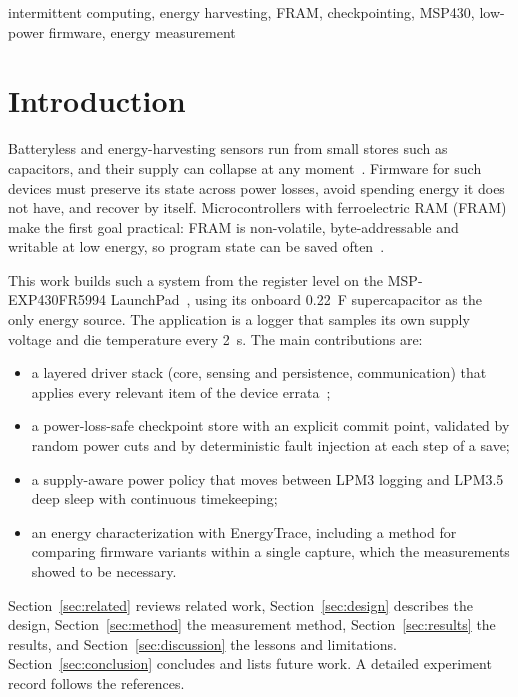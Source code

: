 \documentclass[conference]{IEEEtran}
\begin{document}
\begin{IEEEkeywords}
intermittent computing, energy harvesting, FRAM, checkpointing, MSP430, low-power firmware, energy measurement
\end{IEEEkeywords}

\section{Introduction}

Batteryless and energy-harvesting sensors run from small stores such as capacitors, and their supply can collapse at any moment~\cite{hester2017future,lucia2017snapl}. Firmware for such devices must preserve its state across power losses, avoid spending energy it does not have, and recover by itself. Microcontrollers with ferroelectric RAM (FRAM) make the first goal practical: FRAM is non-volatile, byte-addressable and writable at low energy, so program state can be saved often~\cite{jayakumar2014quickrecall}.

This work builds such a system from the register level on the MSP-EXP430FR5994 LaunchPad~\cite{ti_slau678}, using its onboard \SI{0.22}{\farad} supercapacitor as the only energy source. The application is a logger that samples its own supply voltage and die temperature every \SI{2}{\second}. The main contributions are:
\begin{itemize}
  \item a layered driver stack (core, sensing and persistence, communication) that applies every relevant item of the device errata~\cite{ti_slaz681};
  \item a power-loss-safe checkpoint store with an explicit commit point, validated by random power cuts and by deterministic fault injection at each step of a save;
  \item a supply-aware power policy that moves between LPM3 logging and LPM3.5 deep sleep with continuous timekeeping;
  \item an energy characterization with EnergyTrace, including a method for comparing firmware variants within a single capture, which the measurements showed to be necessary.
\end{itemize}

Section~\ref{sec:related} reviews related work, Section~\ref{sec:design} describes the design, Section~\ref{sec:method} the measurement method, Section~\ref{sec:results} the results, and Section~\ref{sec:discussion} the lessons and limitations. Section~\ref{sec:conclusion} concludes and lists future work. A detailed experiment record follows the references.
\end{document}
